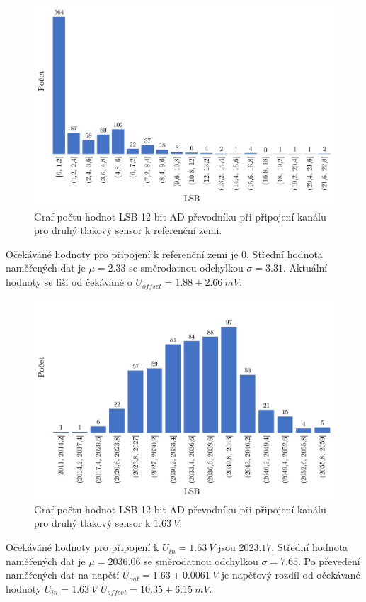 \begin{figure}[H]
    \caption{Graf počtu hodnot LSB 12 bit AD převodníku při připojení kanálu pro druhý tlakový sensor k referenční zemi.}
    \label{fig:hist_vacuum2_gnd}
    \includegraphics[width=1\textwidth]{graphs/vacuum2_gnd.png}

\end{figure}
Očekáváné hodnoty pro připojení k referenční zemi je 0. Střední hodnota naměřených dat je $\mu = 2.33$ se směrodatnou odchylkou $\sigma = 3.31$. Aktuální hodnoty se liší od čekávané o $U_{offset} = 1.88 \pm 2.66 \ mV$.

\begin{figure}[H]
    \caption{Graf počtu hodnot LSB 12 bit AD převodníku při připojení kanálu pro druhý tlakový sensor k $1.63 \ V$.}
    \label{fig:hist_vacuum2_1_6}
    \includegraphics[width=1\textwidth]{graphs/vacuum2_16.png}

\end{figure}
Očekáváné hodnoty pro připojení k $U_{in} = 1.63 \ V$ jsou $2023.17$. Střední hodnota naměřených dat je $\mu = 2036.06$ se směrodatnou odchylkou $\sigma = 7.65$. Po převedení naměřených dat na napětí $U_{out} = 1.63 \pm 0.0061 \ V$ je napěťový rozdíl od očekávané hodnoty $U_{in} = 1.63 \ V$
$U_{offset} = 10.35 \pm 6.15 \ mV$.

